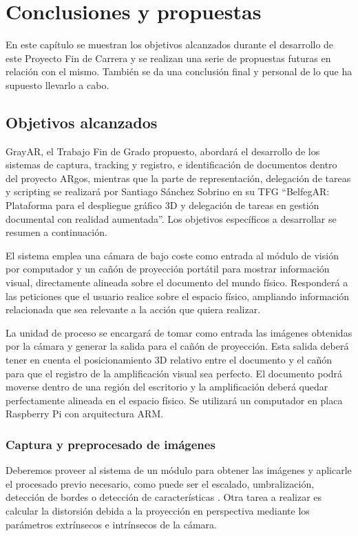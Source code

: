 \chapter{Conclusiones y propuestas}
\label{chap:conclusiones}
En este capítulo se muestran los objetivos alcanzados durante el desarrollo de este Proyecto Fin de Carrera y se realizan una serie de propuestas futuras en relación con el mismo. También se da una conclusión final y personal de lo que ha supuesto llevarlo a cabo.


\section{Objetivos alcanzados}

GrayAR, el Trabajo Fin de Grado propuesto, abordará el desarrollo de los sistemas de captura, tracking y registro, e identificación de documentos dentro del proyecto ARgos, mientras que la parte de representación, delegación de tareas y scripting se realizará por Santiago Sánchez Sobrino en su TFG ``BelfegAR: Plataforma para el despliegue gráfico 3D y delegación de tareas en gestión documental con realidad aumentada''. Los objetivos específicos a desarrollar se resumen a continuación.   

El sistema emplea una cámara de bajo coste como entrada al módulo de visión por computador y un cañón de proyección portátil para mostrar información visual, directamente alineada sobre el documento del mundo físico. Responderá a las peticiones que el usuario realice sobre el espacio físico, ampliando información relacionada que sea relevante a la acción que quiera realizar.

La unidad de proceso se encargará de tomar como entrada las imágenes obtenidas por la cámara y generar la salida para el cañón de proyección. Esta salida deberá tener en cuenta el posicionamiento 3D relativo entre el documento y el cañón para que el registro de la amplificación visual sea perfecto. El documento podrá moverse dentro de una región del escritorio y la amplificación deberá quedar perfectamente alineada en el espacio físico. Se utilizará un computador en placa Raspberry Pi con arquitectura ARM.

\subsection{Captura y preprocesado de imágenes}
Deberemos proveer al sistema de un módulo para obtener las imágenes y aplicarle el procesado previo necesario, como puede ser el escalado, umbralización, detección de bordes o detección de características \cite{Ortiz} \cite{Bay}. Otra tarea a realizar es calcular la distorsión debida a la proyección en perspectiva mediante los parámetros extrínsecos e intrínsecos de la cámara.

